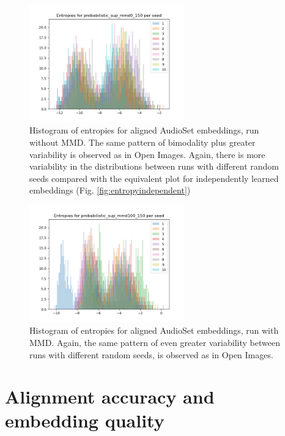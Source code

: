 \begin{figure}[H]
    \centering
    \includegraphics[width=0.6\textwidth]{images/method/probabilistic_aligned/audioset/probabilistic_sup_mmd0_150_entropies.png}
    \caption{
        Histogram of entropies for aligned AudioSet embeddings, run without MMD. The same pattern of bimodality plus greater variability is observed as in Open Images. Again, there is more variability in the distributions between runs with different random seeds compared with the equivalent plot for independently learned embeddings (Fig. \ref{fig:entropyindependent})
    }
\end{figure}

\begin{figure}[H]

    \centering
    \includegraphics[width=0.6\textwidth]{images/method/probabilistic_aligned/audioset/probabilistic_sup_mmd100_150_entropies.png}
    \caption{
        Histogram of entropies for aligned AudioSet embeddings, run with MMD. Again, the same pattern of even greater variability between runs with different random seeds, is observed as in Open Images. 
    }
\end{figure}

\section{Alignment accuracy and embedding quality}

